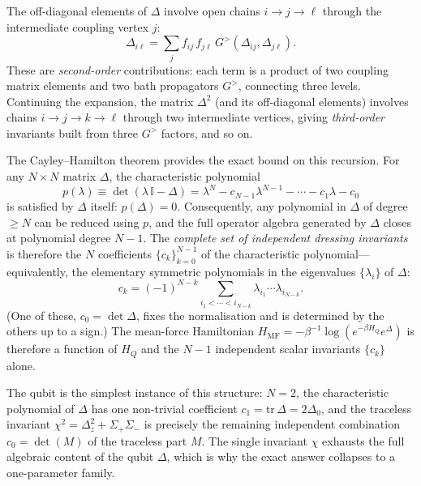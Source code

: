 The off-diagonal elements of $\Delta$ involve open chains $i\to j\to\ell$ through the intermediate
coupling vertex $j$:
\begin{equation}
    \Delta_{i\ell}
    = \sum_j f_{ij}\,f_{j\ell}\,G^{>}(\Delta_{ij},\Delta_{j\ell}).
    \label{eq:Delta_iell_chain}
\end{equation}
These are \emph{second-order} contributions: each term is a product of two coupling matrix elements
and two bath propagators $G^{>}$, connecting three levels. Continuing the expansion, the matrix
$\Delta^2$ (and its off-diagonal elements) involves chains $i\to j\to k\to\ell$ through two
intermediate vertices, giving \emph{third-order} invariants built from three $G^{>}$ factors, and so on.

The Cayley--Hamilton theorem provides the exact bound on this recursion. For any $N\times N$ matrix
$\Delta$, the characteristic polynomial
\begin{equation}
    p(\lambda)\equiv\det(\lambda\,\mathbb{I}-\Delta)
    =\lambda^N - c_{N-1}\lambda^{N-1}-\cdots-c_1\lambda-c_0
    \label{eq:char_poly}
\end{equation}
is satisfied by $\Delta$ itself: $p(\Delta)=0$. Consequently, any polynomial in $\Delta$ of degree
$\geq N$ can be reduced using $p$, and the full operator algebra generated by $\Delta$ closes at
polynomial degree $N-1$. The \emph{complete set of independent dressing invariants} is therefore
the $N$ coefficients $\{c_k\}_{k=0}^{N-1}$ of the characteristic polynomial---equivalently, the
elementary symmetric polynomials in the eigenvalues $\{\lambda_i\}$ of $\Delta$:
\begin{equation}
    c_k = (-1)^{N-k}\sum_{i_1<\cdots<i_{N-k}}\lambda_{i_1}\cdots\lambda_{i_{N-k}}.
    \label{eq:char_coeffs}
\end{equation}
(One of these, $c_0=\det\Delta$, fixes the normalisation and is determined by the others up to
a sign.) The mean-force Hamiltonian $H_{\mathrm{MF}}=-\beta^{-1}\log(e^{-\beta H_Q}e^{\Delta})$
is therefore a function of $H_Q$ and the $N-1$ independent scalar invariants $\{c_k\}$ alone.

The qubit is the simplest instance of this structure: $N=2$, the characteristic polynomial of
$\Delta$ has one non-trivial coefficient $c_1=\mathrm{tr}\,\Delta=2\Delta_0$, and the traceless
invariant $\chi^2=\Delta_z^2+\Sigma_+\Sigma_-$ is precisely the remaining independent combination
$c_0=\det(M)$ of the traceless part $M$. The single invariant $\chi$ exhausts the full algebraic
content of the qubit $\Delta$, which is why the exact answer collapses to a one-parameter family.

